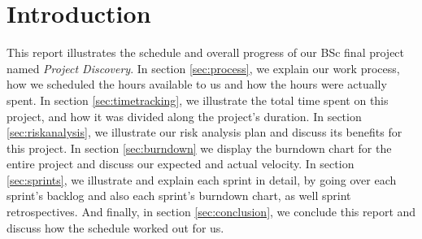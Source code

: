 \section{Introduction}\label{sec:introduction}

This report illustrates the schedule and overall progress of our BSc final project named \emph{Project Discovery}. In section \ref{sec:process}, we explain our work process, how we scheduled the hours available to us and how the hours were actually spent. In section \ref{sec:timetracking}, we illustrate the total time spent on this project, and how it was divided along the project's duration. In section \ref{sec:riskanalysis}, we illustrate our risk analysis plan and discuss its benefits for this project. In section \ref{sec:burndown} we display the burndown chart for the entire project and discuss our expected and actual velocity. In section \ref{sec:sprints}, we illustrate and explain each sprint in detail, by going over each sprint's backlog and also each sprint's burndown chart, as well sprint retrospectives. And finally, in section \ref{sec:conclusion}, we conclude this report and discuss how the schedule worked out for us. 